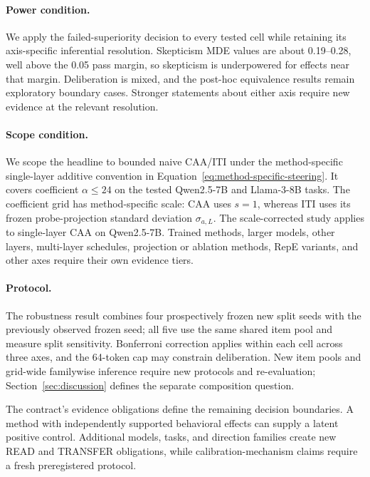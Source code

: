 \documentclass[sigconf]{acmart}
\begin{document}
\paragraph{Power condition.}
We apply the failed-superiority decision to every tested cell while retaining its axis-specific inferential resolution. Skepticism MDE values are about 0.19--0.28, well above the 0.05 pass margin, so skepticism is underpowered for effects near that margin. Deliberation is mixed, and the post-hoc equivalence results remain exploratory boundary cases. Stronger statements about either axis require new evidence at the relevant resolution.

\paragraph{Scope condition.}\setlength{\emergencystretch}{1em}
We scope the headline to bounded naive CAA/ITI under the method-specific single-layer additive convention in Equation~\ref{eq:method-specific-steering}. It covers coefficient \(\alpha\le24\) on the tested Qwen2.5-7B and Llama-3-8B tasks. The coefficient grid has method-specific scale: CAA uses \(s=1\), whereas ITI uses its frozen probe-projection standard deviation \(\sigma_{a,L}\). The scale-corrected study applies to single-layer CAA on Qwen2.5-7B. Trained methods, larger models, other layers, multi-layer schedules, projection or ablation methods, RepE variants, and other axes require their own evidence tiers.

\paragraph{Protocol.}
The robustness result combines four prospectively frozen new split seeds with the previously observed frozen seed; all five use the same shared item pool and measure split sensitivity. Bonferroni correction applies within each cell across three axes, and the 64-token cap may constrain deliberation. New item pools and grid-wide familywise inference require new protocols and re-evaluation; Section~\ref{sec:discussion} defines the separate composition question.

The contract's evidence obligations define the remaining decision boundaries. A method with independently supported behavioral effects can supply a latent positive control. Additional models, tasks, and direction families create new READ and TRANSFER obligations, while calibration-mechanism claims require a fresh preregistered protocol.
\end{document}
